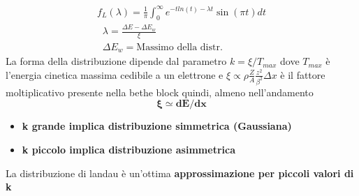 \[
\begin{gathered}
    f_L(\lambda)=\frac{1}{\pi}\int_0^\infty e^{-t ln (t)-\lambda t }\sin (\pi t) dt
\\
\;\;\lambda=\frac{\Delta E -\Delta E_w}{\xi} \;\;
\\
\;\;\Delta E_w=\text{Massimo della distr.}
\end{gathered}\]
La forma della distribuzione dipende dal parametro $k=\xi/T_{max}$ dove $T_{max}$ è l'energia cinetica massima cedibile a un elettrone e $\xi \propto \rho\frac{Z}{A}\frac{z^2}{\beta^2} \Delta x$  è il fattore moltiplicativo presente nella bethe block quindi, almeno nell'andamento \[\mathbf{\xi \simeq dE/dx}\]
\begin{itemize}
    \item \textbf{k grande implica distribuzione simmetrica (Gaussiana)}
\item \textbf{k piccolo implica distribuzione asimmetrica}

\end{itemize}
La distribuzione di landau è un'ottima \textbf{approssimazione per piccoli valori di k}

